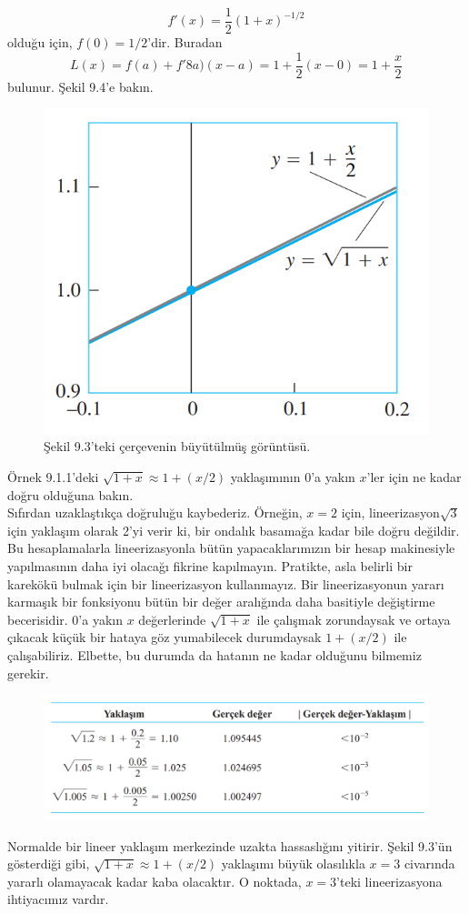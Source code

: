 \begin{cozum}
	\begin{equation*}
	f'(x)=\frac{1}{2}(1+x)^{-1/2}
	\end{equation*}
olduğu için, $f(0)=1/2$'dir. Buradan
	\begin{equation*}
	L(x)=f(a)+f'8a)(x-a)=1+\frac{1}{2}(x-0)=1+\frac{x}{2}
	\end{equation*}
bulunur. Şekil 9.4'e bakın.
\begin{figure}[H]
	\centering
	\includegraphics[width=0.5\linewidth]{lineerizasyon4.png}
	\caption{Şekil 9.3'teki çerçevenin büyütülmüş görüntüsü.}
	\label{fig:ornekresim}
\end{figure}
Örnek 9.1.1'deki $\sqrt{1+x}\approx1+(x/2)$ yaklaşımının 0'a yakın $x$'ler için ne kadar doğru olduğuna bakın.\\
Sıfırdan uzaklaştıkça doğruluğu kaybederiz. Örneğin, $x=2$ için, lineerizasyon$\sqrt{3}$ için yaklaşım olarak 2'yi verir ki, bir ondalık basamağa kadar bile doğru değildir.\\
Bu hesaplamalarla lineerizasyonla bütün yapacaklarımızın bir hesap makinesiyle yapılmasının daha iyi olacağı fikrine kapılmayın. Pratikte, asla belirli bir karekökü bulmak için bir lineerizasyon kullanmayız. Bir lineerizasyonun yararı karmaşık bir fonksiyonu bütün bir değer aralığında daha basitiyle değiştirme becerisidir. 0'a yakın $x$ değerlerinde $\sqrt{1+x}$ ile çalışmak zorundaysak ve ortaya çıkacak küçük bir hataya göz yumabilecek durumdaysak $1+(x/2)$ ile çalışabiliriz. Elbette, bu durumda da hatanın ne kadar olduğunu bilmemiz gerekir.
\begin{figure}[H]
	\centering
	\includegraphics[width=0.9\linewidth]{lineerizasyon5.png}
	\label{fig:ornekresim}
\end{figure}
Normalde bir lineer yaklaşım merkezinde uzakta hassaslığını yitirir. Şekil 9.3'ün gösterdiği gibi, $\sqrt{1+x}\approx1+(x/2)$ yaklaşımı büyük olasılıkla  $x=3$ civarında yararlı olamayacak kadar kaba olacaktır. O noktada, $x=3$'teki lineerizasyona ihtiyacımız vardır.
\end{cozum}
